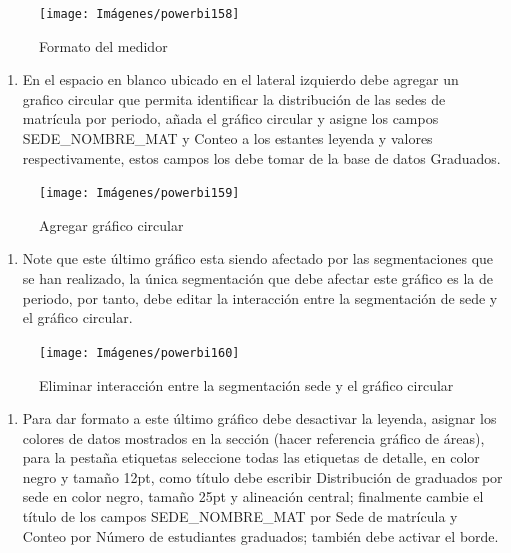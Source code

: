 \documentclass[
]{book}
\providecommand{\tightlist}{%
  \setlength{\itemsep}{0pt}\setlength{\parskip}{0pt}}
\begin{document}
\begin{figure}

{\centering \texttt{[image: Imágenes/powerbi158]} 

}

\caption{Formato del medidor}\label{fig:paso7medidor-fig}
\end{figure}

\begin{enumerate}
\def\labelenumi{\arabic{enumi}.}
\setcounter{enumi}{7}
\tightlist
\item
  En el espacio en blanco ubicado en el lateral izquierdo debe agregar un grafico circular que permita identificar la distribución de las sedes de matrícula por periodo, añada el gráfico circular y asigne los campos SEDE\_NOMBRE\_MAT y Conteo a los estantes leyenda y valores respectivamente, estos campos los debe tomar de la base de datos Graduados.
\end{enumerate}

\begin{figure}

{\centering \texttt{[image: Imágenes/powerbi159]} 

}

\caption{Agregar gráfico circular}\label{fig:paso8medidor-fig}
\end{figure}

\begin{enumerate}
\def\labelenumi{\arabic{enumi}.}
\setcounter{enumi}{8}
\tightlist
\item
  Note que este último gráfico esta siendo afectado por las segmentaciones que se han realizado, la única segmentación que debe afectar este gráfico es la de periodo, por tanto, debe editar la interacción entre la segmentación de sede y el gráfico circular.
\end{enumerate}

\begin{figure}

{\centering \texttt{[image: Imágenes/powerbi160]} 

}

\caption{Eliminar interacción entre la segmentación sede y el gráfico circular}\label{fig:paso9medidor-fig}
\end{figure}

\begin{enumerate}
\def\labelenumi{\arabic{enumi}.}
\setcounter{enumi}{9}
\tightlist
\item
  Para dar formato a este último gráfico debe desactivar la leyenda, asignar los colores de datos mostrados en la sección (hacer referencia gráfico de áreas), para la pestaña etiquetas seleccione todas las etiquetas de detalle, en color negro y tamaño 12pt, como título debe escribir Distribución de graduados por sede en color negro, tamaño 25pt y alineación central; finalmente cambie el título de los campos SEDE\_NOMBRE\_MAT por Sede de matrícula y Conteo por Número de estudiantes graduados; también debe activar el borde.
\end{enumerate}
\end{document}
